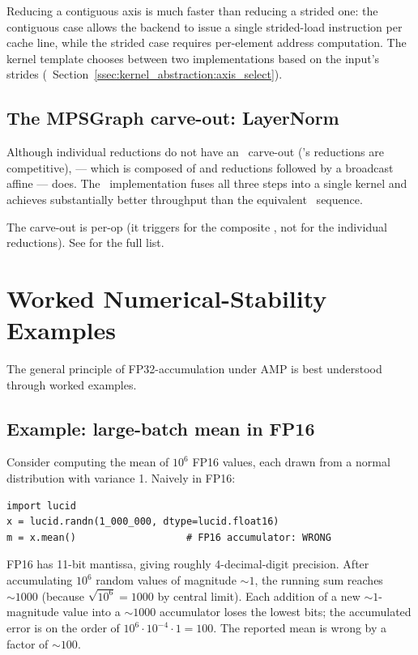 Reducing a contiguous axis is much faster than reducing a strided
one: the contiguous case allows the backend to issue a single
strided-load instruction per cache line, while the strided case
requires per-element address computation. The kernel template
chooses between two implementations based on the input's strides
(~Section~\ref{ssec:kernel_abstraction:axis_select}).

\subsection{The MPSGraph carve-out: LayerNorm}
\label{ssec:reductions:layernorm_mps}

Although individual reductions do not have an \MPSGraph\ carve-out
(\MLX's reductions are competitive),  ---  which
is composed of  and  reductions followed by a
broadcast affine --- does. The \MPSGraph\ implementation fuses
all three steps into a single kernel and achieves substantially
better throughput than the equivalent \MLX\ sequence.

The carve-out is per-op (it triggers for the composite
, not for the individual reductions). See
 for the full list.

\section{Worked Numerical-Stability Examples}
\label{sec:reductions:worked_stability}

The general principle of FP32-accumulation under AMP is best
understood through worked examples.

\subsection{Example: large-batch mean in FP16}
\label{ssec:reductions:large_mean}

Consider computing the mean of $10^6$ FP16 values, each drawn from
a normal distribution with variance 1. Naively in FP16:

\begin{lstlisting}[style=lucid,language=LucidPython]
import lucid
x = lucid.randn(1_000_000, dtype=lucid.float16)
m = x.mean()                   # FP16 accumulator: WRONG
\end{lstlisting}

FP16 has 11-bit mantissa, giving roughly 4-decimal-digit precision.
After accumulating $10^6$ random values of magnitude $\sim 1$, the
running sum reaches $\sim 1000$ (because $\sqrt{10^6} = 1000$ by
central limit). Each addition of a new $\sim 1$-magnitude value
into a $\sim 1000$ accumulator loses the lowest bits; the
accumulated error is on the order of $10^6 \cdot 10^{-4} \cdot 1 =
100$. The reported mean is wrong by a factor of $\sim 100$.

